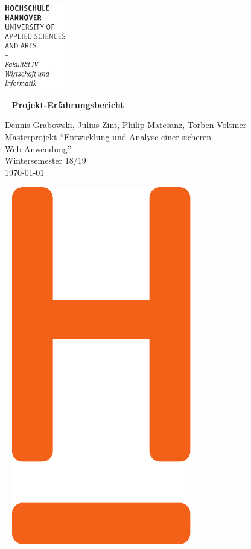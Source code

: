 \documentclass[12pt,DIV14,BCOR10mm,a4paper,parskip=half-,headsepline,headinclude,english,ngerman,bibliography=totocnumbered]{scrreprt}
\begin{document}
  \thispagestyle{empty} %
\includegraphics[width=0.2\textwidth]{Wortmarke_WI_schwarz}

   {  ~ \sffamily
  \vfill
  {\Huge\bfseries Projekt-Erfahrungsbericht}
  \bigskip

  {\Large
  Dennis Grabowski, Julius Zint, Philip Matesanz, Torben Voltmer \\[2ex]
  Masterprojekt \enquote{Entwicklung und Analyse einer sicheren \\Web-Anwendung} \\
  Wintersemester 18/19
 \\[5ex]
   \today }
}
 \vfill

  ~ \hfill
  \includegraphics[height=0.3\paperheight]{H_WI_Pantone1665}
\end{document}
